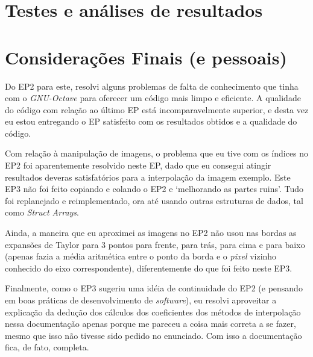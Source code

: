 \documentclass[11pt]{article}
\begin{document}
  \pagebreak

  \section{Testes e análises de resultados}

  \indent\indent

  \section{Considerações Finais (e pessoais)}

  \indent\indent Do EP2 para este, resolvi alguns problemas de falta de conhecimento que tinha com o \textit{GNU-Octave} para oferecer um código mais limpo e eficiente. A qualidade do código
  com relação ao último EP está incomparavelmente superior, e desta vez eu estou entregando o EP satisfeito com os resultados obtidos e a qualidade do código.

  Com relação à manipulação de imagens, o problema que eu tive com os índices no EP2 foi aparentemente resolvido neste EP, dado que eu consegui atingir resultados deveras satisfatórios para a interpolação da imagem exemplo.
  Este EP3 não foi feito copiando e colando o EP2 e `melhorando as partes ruins'. Tudo foi replanejado e reimplementado, ora até usando outras estruturas de dados, tal como \textit{Struct Arrays}.

  Ainda, a maneira que eu aproximei as imagens no EP2 não usou nas bordas as expansões de Taylor para 3 pontos para frente, para trás, para cima e para baixo (apenas fazia a média aritmética entre o ponto da borda
  e o \textit{pixel} vizinho conhecido do eixo correspondente), diferentemente do que foi feito neste EP3.

  Finalmente, como o EP3 sugeriu uma idéia de continuidade do EP2 (e pensando em boas práticas de desenvolvimento de \textit{software}), eu resolvi aproveitar a explicação da dedução dos cálculos dos
  coeficientes dos métodos de interpolação nessa documentação apenas porque me pareceu a coisa mais correta a se fazer, mesmo que isso não tivesse sido pedido no enunciado. Com isso a documentação fica, de fato, completa.
\end{document}
